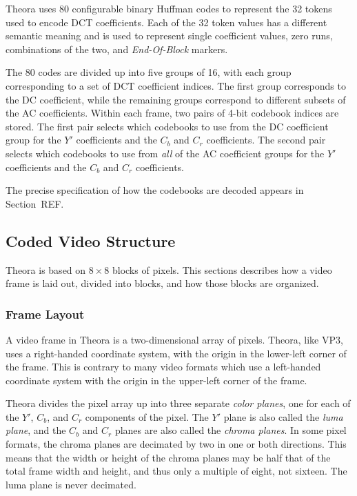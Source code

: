 \documentclass[11pt,letterpaper]{article}
\newcommand{\term}[1]{{\em #1}}
\begin{document}
Theora uses 80 configurable binary Huffman codes to represent the 32 tokens
 used to encode DCT coefficients.
Each of the 32 token values has a different semantic meaning and is used to
 represent single coefficient values, zero runs, combinations of the two, and
 \term{End-Of-Block} markers.

The 80 codes are divided up into five groups of 16, with each group
 corresponding to a set of DCT coefficient indices.
The first group corresponds to the DC coefficient, while the remaining groups
 correspond to different subsets of the AC coefficients.
Within each frame, two pairs of 4-bit codebook indices are stored.
The first pair selects which codebooks to use from the DC coefficient group for
 the $Y'$ coefficients and the $C_b$ and $C_r$ coefficients.
The second pair selects which codebooks to use from {\em all} of the AC
 coefficient groups for the $Y'$ coefficients and the $C_b$ and $C_r$
 coefficients.

The precise specification of how the codebooks are decoded appears in
 Section~REF.

\subsection{Coded Video Structure}

Theora is based on $8\times 8$ blocks of pixels.
This sections describes how a video frame is laid out, divided into blocks, and
 how those blocks are organized.

\subsubsection{Frame Layout}

A video frame in Theora is a two-dimensional array of pixels.
Theora, like VP3, uses a right-handed coordinate system, with the origin in the
 lower-left corner of the frame.
This is contrary to many video formats which use a left-handed coordinate
 system with the origin in the upper-left corner of the frame.

Theora divides the pixel array up into three separate \term{color planes}, one
 for each of the $Y'$, $C_b$, and $C_r$ components of the pixel.
The $Y'$ plane is also called the \term{luma plane}, and the $C_b$ and $C_r$
 planes are also called the \term{chroma planes}.
In some pixel formats, the chroma planes are decimated by two in one or both
 directions.
This means that the width or height of the chroma planes may be half that of
 the total frame width and height, and thus only a multiple of eight, not
 sixteen.
The luma plane is never decimated.
\end{document}
